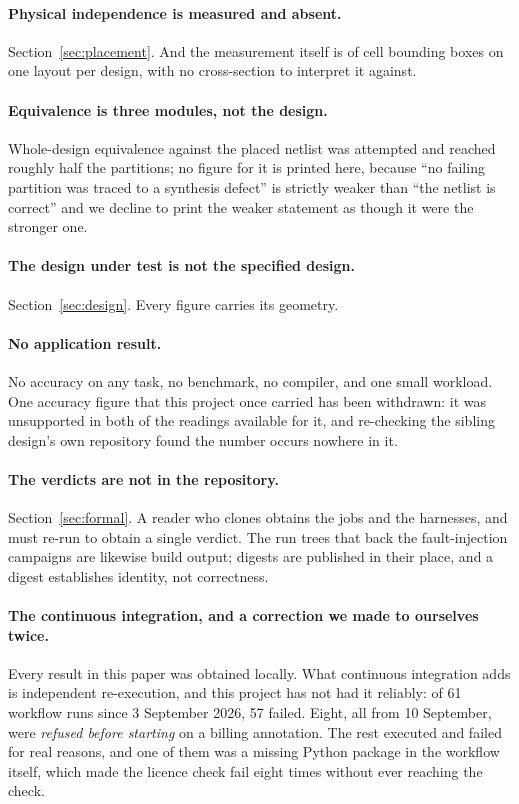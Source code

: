 \documentclass[11pt,a4paper]{article}
\begin{document}
\paragraph{Physical independence is measured and absent.}
Section~\ref{sec:placement}. And the measurement itself is of cell
bounding boxes on one layout per design, with no cross-section to
interpret it against.

\paragraph{Equivalence is three modules, not the design.}
Whole-design equivalence against the placed netlist was attempted and
reached roughly half the partitions; no figure for it is printed here,
because ``no failing partition was traced to a synthesis defect'' is
strictly weaker than ``the netlist is correct'' and we decline to print
the weaker statement as though it were the stronger one.

\paragraph{The design under test is not the specified design.}
Section~\ref{sec:design}. Every figure carries its geometry.

\paragraph{No application result.}
No accuracy on any task, no benchmark, no compiler, and one small
workload. One accuracy figure that this project once carried has been
withdrawn: it was unsupported in both of the readings available for it,
and re-checking the sibling design's own repository found the number
occurs nowhere in it.

\paragraph{The verdicts are not in the repository.}
Section~\ref{sec:formal}. A reader who clones obtains the jobs and the
harnesses, and must re-run to obtain a single verdict. The run trees that
back the fault-injection campaigns are likewise build output; digests are
published in their place, and a digest establishes identity, not
correctness.

\paragraph{The continuous integration, and a correction we made to
ourselves twice.}
Every result in this paper was obtained locally. What continuous
integration adds is independent re-execution, and this project has not
had it reliably: of 61 workflow runs since 3 September 2026, 57 failed.
Eight, all from 10 September, were \emph{refused before starting} on a
billing annotation. The rest executed and failed for real reasons, and
one of them was a missing Python package in the workflow itself, which
made the licence check fail eight times without ever reaching the check.
\end{document}
